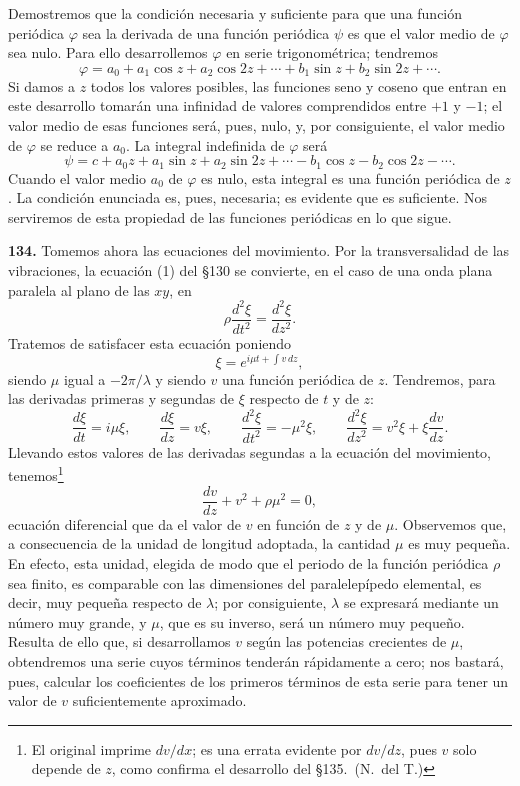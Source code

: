 Demostremos que la condición necesaria y suficiente para que una función
periódica $\varphi$ sea la derivada de una función periódica $\psi$ es que
el valor medio de $\varphi$ sea nulo. Para ello desarrollemos $\varphi$ en
serie trigonométrica; tendremos
\[
\varphi=a_0+a_1\cos z+a_2\cos 2z+\cdots+b_1\sin z+b_2\sin 2z+\cdots.
\]
Si damos a $z$ todos los valores posibles, las funciones seno y coseno que
entran en este desarrollo tomarán una infinidad de valores comprendidos
entre $+1$ y $-1$; el valor medio de esas funciones será, pues, nulo, y,
por consiguiente, el valor medio de $\varphi$ se reduce a $a_0$. La
integral indefinida de $\varphi$ será
\[
\psi=c+a_0z+a_1\sin z+a_2\sin 2z+\cdots-b_1\cos z-b_2\cos 2z-\cdots.
\]
Cuando el valor medio $a_0$ de $\varphi$ es nulo, esta integral es una
función periódica de $z$. La condición enunciada es, pues, necesaria; es
evidente que es suficiente. Nos serviremos de esta propiedad de las
funciones periódicas en lo que sigue.

\noindent\textbf{134.} Tomemos ahora las ecuaciones del movimiento. Por la
transversalidad de las vibraciones, la ecuación (1) del §130 se convierte,
en el caso de una onda plana paralela al plano de las $xy$, en
\[
\rho\frac{d^2\xi}{dt^2}=\frac{d^2\xi}{dz^2}.
\]
Tratemos de satisfacer esta ecuación poniendo
\[
\xi=e^{i\mu t+\int v\,dz},
\]
siendo $\mu$ igual a $-2\pi/\lambda$ y siendo $v$ una función periódica de
$z$. Tendremos, para las derivadas primeras y segundas de $\xi$ respecto de
$t$ y de $z$:
\[
\frac{d\xi}{dt}=i\mu\xi,\qquad \frac{d\xi}{dz}=v\xi,\qquad
\frac{d^2\xi}{dt^2}=-\mu^2\xi,\qquad
\frac{d^2\xi}{dz^2}=v^2\xi+\xi\frac{dv}{dz}.
\]
Llevando estos valores de las derivadas segundas a la ecuación del
movimiento, tenemos\footnote{El original imprime $dv/dx$; es una
errata evidente por $dv/dz$, pues $v$ solo depende de $z$, como confirma el
desarrollo del §135.~(N.~del T.)}
\begin{equation}
\frac{dv}{dz}+v^2+\rho\mu^2=0,
\tag{1}
\end{equation}
ecuación diferencial que da el valor de $v$ en función de $z$ y de $\mu$.
Observemos que, a consecuencia de la unidad de longitud adoptada, la
cantidad $\mu$ es muy pequeña. En efecto, esta unidad, elegida de modo que
el periodo de la función periódica $\rho$ sea finito, es comparable con
las dimensiones del paralelepípedo elemental, es decir, muy pequeña
respecto de $\lambda$; por consiguiente, $\lambda$ se expresará mediante un
número muy grande, y $\mu$, que es su inverso, será un número muy pequeño.
Resulta de ello que, si desarrollamos $v$ según las potencias crecientes
de $\mu$, obtendremos una serie cuyos términos tenderán rápidamente a
cero; nos bastará, pues, calcular los coeficientes de los primeros
términos de esta serie para tener un valor de $v$ suficientemente
aproximado.

